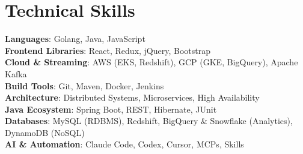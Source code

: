 \documentclass[letterpaper,10pt]{article}
\begin{document}
\section{Technical Skills}
 \begin{itemize}[leftmargin=0.15in, label={}]
    \small{\item{
    \textbf{Languages}{: Golang, Java, JavaScript} \\
    \textbf{Frontend Libraries}{: React, Redux, jQuery, Bootstrap} \\
    \textbf{Cloud \& Streaming}{: AWS (EKS, Redshift), GCP (GKE, BigQuery), Apache Kafka} \\
    \textbf{Build Tools}{: Git, Maven, Docker, Jenkins} \\
    \textbf{Architecture}{: Distributed Systems, Microservices, High Availability} \\
    \textbf{Java Ecosystem}{: Spring Boot, REST, Hibernate, JUnit} \\
    \textbf{Databases}{: MySQL (RDBMS), Redshift, BigQuery \& Snowflake (Analytics), DynamoDB (NoSQL)} \\
    \textbf{AI \& Automation}{: Claude Code, Codex, Cursor, MCPs, Skills}
    }}
 \end{itemize}

\end{document}
